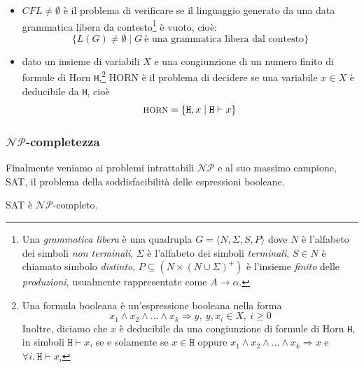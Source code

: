 \begin{example}
    \hfill
    \begin{itemize}
        \item $CFL \neq \emptyset$ è il problema di verificare se il linguaggio generato da una data grammatica libera da contesto\footnote{Una \textit{grammatica libera} è una quadrupla $G = \langle N, \Sigma, S, P\rangle$ dove $N$ è l'alfabeto dei simboli \textit{non terminali}, $\Sigma$ è l'alfabeto dei simboli \textit{terminali}, $S \in N$ è chiamato simbolo \textit{distinto}, $P \subseteq (N \times (N \cup \Sigma)^+)$ è l'insieme \textit{finito} delle \textit{produzioni}, usualmente rappresentate come $A \rightarrow \alpha$.} è vuoto, cioè:\ \[\{L(G) \neq \emptyset \mid G\ \mbox{è una grammatica libera dal contesto}\}\]
        \item dato un insieme di variabili $X$ e una congiunzione di un numero finito di formule di Horn \texttt{H},\footnote{Una formula booleana è un'espressione booleana nella forma \[x_1 \land x_2 \land \dots \land x_k \Longrightarrow y,\ y,x_i \in X,\ i \geq 0\] Inoltre, diciamo che $x$ è deducibile da una congiunzione di formule di Horn \texttt{H}, in simboli $\mathtt{H}\vdash x$, se e solamente se $x \in \mathtt{H}$ oppure $x_1 \land x_2 \land \dots \land x_k \Longrightarrow x$ e $ \forall i.\ \mathtt{H} \vdash x_i$} {\footnotesize HORN} è il problema di decidere se una variabile $x \in X$ è deducibile da \texttt{H}, cioè \[\mbox{\footnotesize HORN} = \{\mathtt{H}, x \mid \mathtt{H} \vdash x\}\]
    \end{itemize}
\end{example}

\newpage

\subsubsection{$\mathcal{NP}$-completezza}

Finalmente veniamo ai problemi intrattabili $\mathcal{NP}$ e al suo massimo campione, {\footnotesize SAT}, il problema della soddisfacibilità delle espressioni booleane.

\begin{theorem} [Cook]
    {\footnotesize SAT} è $\mathcal{NP}$-completo.
\end{theorem}

